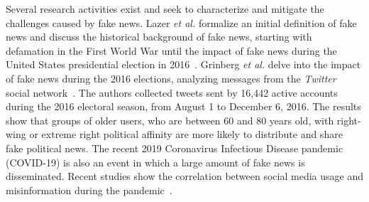 \documentclass{ieeeaccess}
\begin{document}
Several research activities exist and seek to characterize and mitigate the challenges caused by fake news. Lazer \textit {et al.} formalize an initial definition of fake news and discuss the historical background of fake news, starting with defamation in the First World War until the impact of fake news during the United States presidential election in 2016~\cite{lazer2018science}. Grinberg \textit{et al.} delve into the impact of fake news during the 2016 elections, analyzing messages from the  \textit{Twitter} social network~\cite{grinberg2019fake}. The authors collected tweets sent by 16,442 active accounts during the 2016 electoral season, from August 1 to December 6, 2016. The results show that groups of older users, who are between 60 and 80 years old, with right-wing or extreme right political affinity  are more likely to distribute and share fake political news. The recent 2019 Coronavirus Infectious Disease pandemic (COVID-19) is also an event in which a large amount of fake news is disseminated. Recent studies show the correlation between social media usage and misinformation during the pandemic~\cite{pennycook2020fighting, van2020using}.
\end{document}
